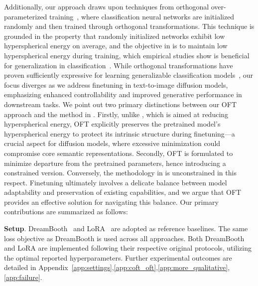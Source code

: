 \begin{itemize}[leftmargin=*,nosep]
Additionally, our approach draws upon techniques from orthogonal over-parameterized training~\cite{liu2021orthogonal}, where classification neural networks are initialized randomly and then trained through orthogonal transformations. This technique is grounded in the property that randomly initialized networks exhibit low hyperspherical energy on average, and the objective in \cite{liu2021orthogonal} is to maintain low hyperspherical energy during training, which empirical studies show is beneficial for generalization in classification~\cite{liu2018learning,lin2020regularizing}. While orthogonal transformations have proven sufficiently expressive for learning generalizable classification models~\cite{liu2021orthogonal}, our focus diverges as we address finetuning in text-to-image diffusion models, emphasizing enhanced controllability and improved generative performance in downstream tasks. We point out two primary distinctions between our OFT approach and the method in \cite{liu2021orthogonal}. Firstly, unlike \cite{liu2021orthogonal}, which is aimed at reducing hyperspherical energy, OFT explicitly preserves the pretrained model’s hyperspherical energy to protect its intrinsic structure during finetuning—a crucial aspect for diffusion models, where excessive minimization could compromise core semantic representations. Secondly, OFT is formulated to minimize departure from the pretrained parameters, hence introducing a constrained version. Conversely, the methodology in \cite{liu2021orthogonal} is unconstrained in this respect. Finetuning ultimately involves a delicate balance between model adaptability and preservation of existing capabilities, and we argue that OFT provides an effective solution for navigating this balance. Our primary contributions are summarized as follows:

\textbf{Setup}. DreamBooth~\cite{ruiz2023dreambooth} and LoRA~\cite{hulora2022} are adopted as reference baselines. The same loss objective as DreamBooth is used across all approaches. Both DreamBooth and LoRA are implemented following their respective original protocols, utilizing the optimal reported hyperparameters. Further experimental outcomes are detailed in Appendix~\ref{app:settings},\ref{app:coft_oft},\ref{app:more_qualitative},\ref{app:failure}.


\end{itemize}
